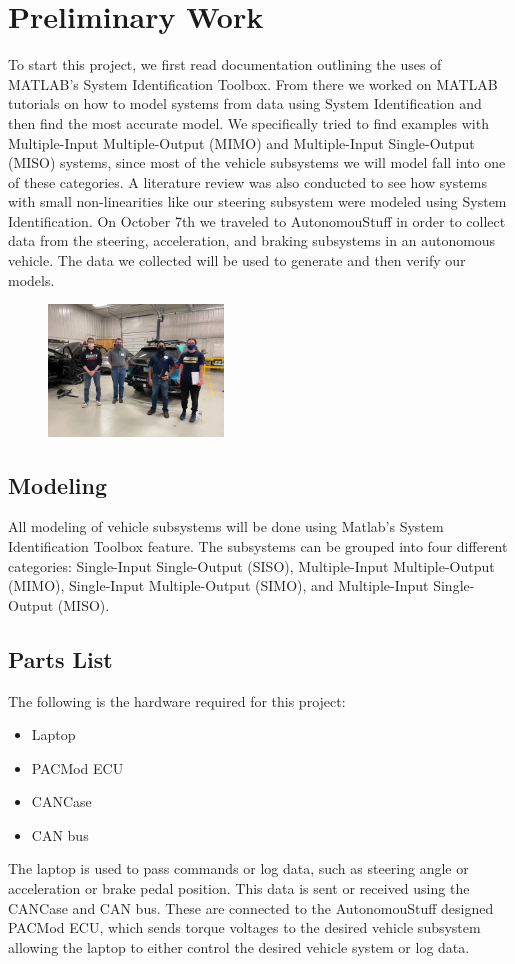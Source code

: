 \documentclass[letterpaper,12pt]{article}   %
\begin{document}
\section{Preliminary Work}
To start this project, we first read documentation outlining the uses of MATLAB's System Identification Toolbox. From there we worked on MATLAB tutorials on how to model systems from data using System Identification and then find the most accurate model. We specifically tried to find examples with Multiple-Input Multiple-Output (MIMO) and Multiple-Input Single-Output (MISO) systems, since most of the vehicle subsystems we will model fall into one of these categories. A literature review was also conducted to see how systems with small non-linearities like our steering subsystem were modeled using System Identification. On October 7th we traveled to AutonomouStuff in order to collect data from the steering, acceleration, and braking subsystems in an autonomous vehicle. The data we collected will be used to generate and then verify our models. 
\begin{figure}[h]
	\centering
		{\includegraphics[height=3.5cm, width=0.4\linewidth]{figs/img/picturesVisitToAStuff/visitors1-20211007}}
\end{figure}

 \subsection{Modeling} \label{sec:model}
 All modeling of vehicle subsystems will be done using Matlab's System Identification Toolbox feature. The subsystems can be grouped into four different categories: Single-Input Single-Output (SISO), Multiple-Input Multiple-Output (MIMO), Single-Input Multiple-Output (SIMO), and Multiple-Input Single-Output (MISO).
 
 \subsection{Parts List}
	The following is the hardware required for this project:  
	\begin{itemize}
    		\item Laptop
    		\item PACMod ECU
    		\item CANCase 
    		\item CAN bus 
 	\end{itemize}
	The laptop is used to pass commands or log data, such as steering angle or acceleration or brake pedal position. This data is sent or received using the CANCase and CAN bus. These are connected to the AutonomouStuff designed PACMod ECU, which sends torque voltages to the desired vehicle subsystem allowing the laptop to either control the desired vehicle system or log data.\bigskip
\end{document}
